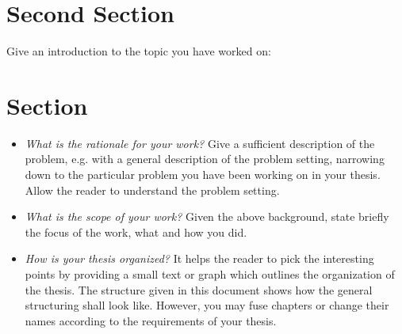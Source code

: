 \section{Second Section}
Give an introduction to the topic you have worked on:
\section{Section}
\begin{itemize}
 \item \textit{What is the rationale for your work?} Give a sufficient description of the problem, e.g. with a general description of the problem setting, narrowing down to the particular problem you have been working on in your thesis. Allow the reader to understand the problem setting. 
 \item \textit{What is the scope of your work?} Given the above background, state briefly the focus of the work, what and how you did.
 \item \textit{How is your thesis organized?} It helps the reader to pick the interesting points by providing a small text or graph which outlines the organization of the thesis. The structure given in this document shows how the general structuring shall look like. However, you may fuse chapters or change their names according to the requirements of your thesis.
\end{itemize}
